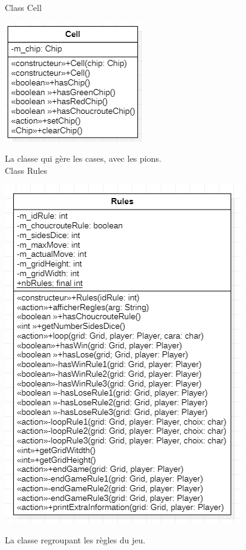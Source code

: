 Class Cell
\begin{center}
\includegraphics{Cell.png}
\end{center}
La classe qui gère les cases, avec les pions. \\

Class Rules
\begin{center}
\includegraphics{Rules.png}
\end{center}
La classe regroupant les règles du jeu. \\

